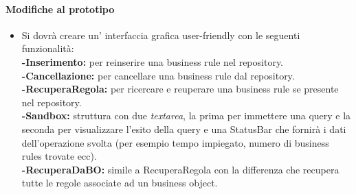\documentclass[11pt,titlepage,a4paper]{report}
\begin{document}
\paragraph{Modifiche al prototipo}
\begin{itemize}
\item Si dovr\`a creare un' interfaccia grafica user-friendly con le seguenti funzionalit\`a:\\
\textbf{-Inserimento:} per reinserire una business rule nel repository.\\
\textbf{-Cancellazione:} per cancellare una business rule dal repository.\\
\textbf{-RecuperaRegola:} per ricercare e reuperare una business rule se presente nel repository.\\
\textbf{-Sandbox: }struttura con due \textit{textarea}, la prima per immettere una query e la seconda per visualizzare l'esito della query e una StatusBar che fornir\`a i dati dell'operazione svolta (per esempio tempo impiegato, numero di business rules trovate ecc).\\
\textbf{-RecuperaDaBO: }simile a RecuperaRegola con la differenza che recupera tutte le regole associate ad un business object.\\
\end{itemize}
\end{document}
